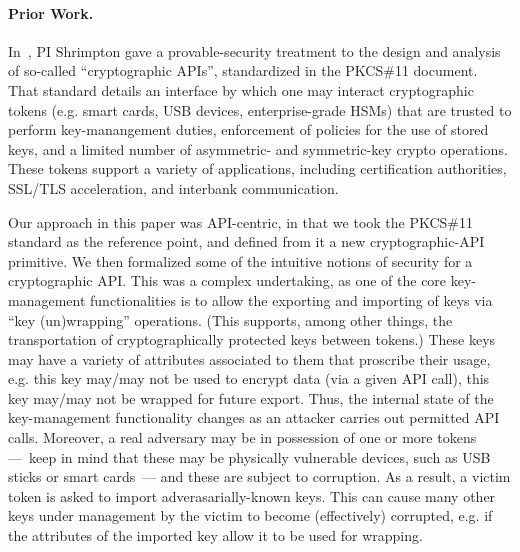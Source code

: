\paragraph{Prior Work.}
In~\cite{SSW}, PI Shrimpton gave a provable-security treatment to the design and
analysis of so-called ``cryptographic APIs'', standardized in the PKCS\#11
document\cite{xxx}.  That standard details an interface by which one may interact
cryptographic tokens (e.g. smart cards, USB devices, enterprise-grade HSMs) that
are trusted to perform key-manangement duties, enforcement of policies for the
use of stored keys, and a limited number of asymmetric- and symmetric-key crypto
operations.  These tokens support a variety of applications, including
certification authorities, SSL/TLS acceleration, and interbank communication.

Our approach in this paper was API-centric, in that we took the PKCS\#11
standard as the reference point, and defined from it a new cryptographic-API
primitive.  We then formalized some of the intuitive notions of security for a
cryptographic API.  This was a complex undertaking, as one of the core
key-management functionalities is to allow the exporting and importing of keys
via ``key (un)wrapping'' operations.  (This supports, among other things, the
transportation of cryptographically protected keys between tokens.)  These keys
may have a variety of attributes associated to them that proscribe
their usage, e.g. this key may/may not be used to encrypt data (via a given API
call), this key may/may not be wrapped for future export.  Thus, the internal
state of the key-management functionality changes as an attacker carries out
permitted API calls.  
Moreover, a real adversary may be in possession of one or
more tokens ---~keep in mind that these may be physically vulnerable
devices, such as USB sticks or smart cards~--- and these are subject
to corruption.  As a result, a victim token is asked to
import adverasarially-known keys.  This can cause many other keys
under management by the victim to become (effectively) corrupted, 
e.g. if the attributes of the imported key allow it to be used for wrapping.


